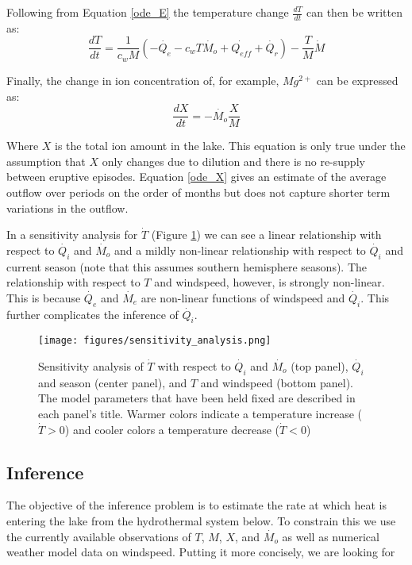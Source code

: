 \documentclass{bmc_template/bmcart}
\begin{document}
Following from Equation \ref{ode_E} the temperature change $\frac{dT}{dt}$ can then be written as:
\begin{equation}\label{ode_T}
	\frac{dT}{dt}=\frac{1}{c_wM}\left(-\dot{Q_e} - c_wT\dot{M_o} + \dot{Q_{eff}} + \dot{Q_r}\right )
	-\frac{T}{M}\dot{M}
\end{equation}

Finally, the change in ion concentration of, for example, $Mg^{2+}$ can be expressed as:
\begin{equation}\label{ode_X}
	\frac{dX}{dt}=-\dot{M_o}\frac{X}{M}
\end{equation}

Where $X$ is the total ion amount in the lake. This equation is only true under
the assumption that $X$ only changes due to dilution and there is no re-supply
between eruptive episodes. Equation \ref{ode_X} gives an estimate of the average
outflow over periods on the order of months but does not capture shorter term
variations in the outflow.

In a sensitivity analysis for $\dot{T}$ (Figure \ref{sens}) we can see a linear
relationship with respect to $\dot{Q_i}$ and $\dot{M_o}$ and a mildly
non-linear relationship with respect to $\dot{Q_i}$ and current season
(note that this assumes southern hemisphere seasons). The relationship with respect
to $T$ and windspeed, however, is strongly non-linear. This is because $\dot{Q_e}$
and $\dot{M_e}$ are non-linear functions of windspeed and $\dot{Q_i}$. This further 
complicates the inference of $\dot{Q_i}$.

\begin{figure}
    \texttt{[image: figures/sensitivity\_analysis.png]}  
    \caption{Sensitivity analysis of $\dot{T}$ with respect to $\dot{Q_i}$ 
             and $\dot{M_o}$ (top panel), $\dot{Q_i}$ and season 
             (center panel), and $T$ and windspeed (bottom panel). The model
              parameters that have been held fixed are described in each 
              panel's title. Warmer colors indicate a temperature increase
              ($\dot{T} > 0$) and cooler colors a temperature decrease
              ($\dot{T} < 0$)}
      \label{sens}
\end{figure}
    

\subsection*{Inference}\label{inf}

The objective of the inference problem is to estimate the rate at which heat
is entering the lake from the hydrothermal system below.
To constrain this we use the currently available observations of $T$, $M$,
$X$, and $\dot{M_o}$ as well as numerical weather model data on windspeed.
Putting it more concisely, we are looking for 
\end{document}

